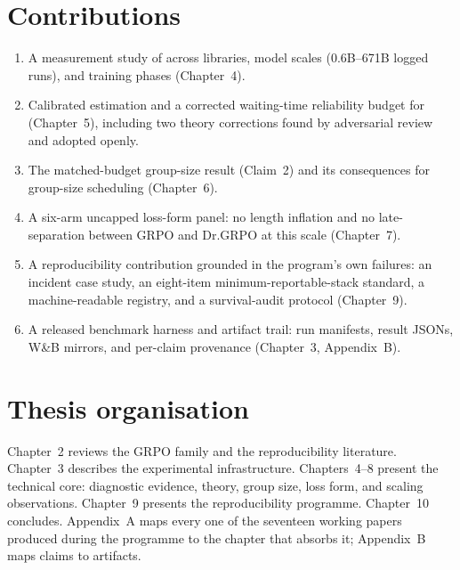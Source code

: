 \section{Contributions}
\begin{enumerate}[leftmargin=1.6em,itemsep=1pt]
  \item A measurement study of \ZVF{} across libraries, model scales
        (0.6B--671B logged runs), and training phases (Chapter~4).
  \item Calibrated estimation and a corrected waiting-time reliability budget
        for \ZVF{} (Chapter~5), including two theory corrections found by
        adversarial review and adopted openly.
  \item The matched-budget group-size result (Claim~2) and its consequences
        for group-size scheduling (Chapter~6).
  \item A six-arm uncapped loss-form panel: no length inflation and no
        late-\ZVF{} separation between GRPO and Dr.GRPO at this scale
        (Chapter~7).
  \item A reproducibility contribution grounded in the program's own failures:
        an incident case study, an eight-item minimum-reportable-stack
        standard, a machine-readable registry, and a survival-audit protocol
        (Chapter~9).
  \item A released benchmark harness and artifact trail: run manifests,
        result JSONs, W\&B mirrors, and per-claim provenance
        (Chapter~3, Appendix~B).
\end{enumerate}

\section{Thesis organisation}
Chapter~2 reviews the GRPO family and the reproducibility literature.
Chapter~3 describes the experimental infrastructure. Chapters~4--8 present the
technical core: diagnostic evidence, theory, group size, loss form, and
scaling observations. Chapter~9 presents the reproducibility programme.
Chapter~10 concludes. Appendix~A maps every one of the seventeen working
papers produced during the programme to the chapter that absorbs it;
Appendix~B maps claims to artifacts.
